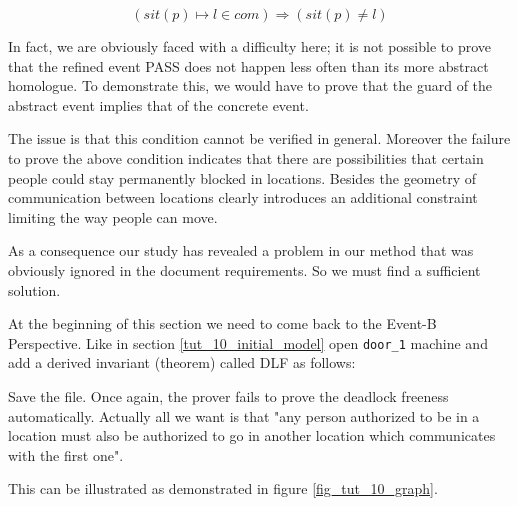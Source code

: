 \[
( sit(p) \mapsto l \in com ) \Rightarrow ( sit(p)\neq l )
\]

In fact, we are obviously faced with a difficulty here; it is not possible to prove that the refined event \textsf{PASS} does not happen less often than its more abstract homologue. To demonstrate this, we would have to prove that the guard of the abstract event implies that of the concrete event.

The issue is that this condition cannot be verified in general. Moreover the failure to prove the above condition indicates that there are possibilities that certain people could stay permanently blocked in locations. Besides the geometry of communication between locations clearly introduces an additional constraint limiting the way people can move.

As a consequence our study has revealed a problem in our method that was obviously ignored in the document requirements. So we must find a sufficient solution.


At the beginning of this section we need to come back to the \textsf{Event-B Perspective}. Like in section \ref{tut_10_initial_model} open \texttt{door\_1} machine and add a derived invariant (theorem) called \textsf{DLF} as follows: 

\begin{description}
\INVARIANTS
	\begin{description}
	\end{description}
\end{description}

Save the file. Once again, the prover fails to prove the deadlock freeness automatically. Actually all we want is that "any person authorized to be in a location must also be authorized to go in another location which communicates with the first one".

This can be illustrated as demonstrated in figure \ref{fig_tut_10_graph}.


